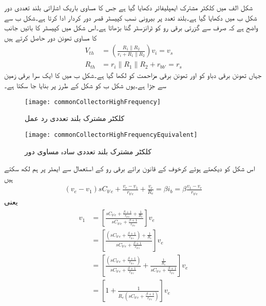 شکل  الف میں کلکٹر  مشترک ایمپلیفائر دکھایا گیا ہے جس کا مساوی باریک اشاراتی بلند تعددی دور شکل  ب میں دکھایا گیا ہے۔بلند تعدد پر بیرونی نسب کپیسٹر  قصر دور کردار ادا کرتا ہے۔شکل  ب سے واضح ہے کہ صرف  سے گزرتی برقی رو  کو ٹرانزسٹر  گنا بڑھاتا ہے۔اس شکل میں کپیسٹر  کا بائیں جانب کا مساوی تھونن دور حاصل کرتے ہیں
\begin{align*}
V_{th}&=\left(\frac{R_1 \mathbin{\|} R_2}{r_i+R_1 \mathbin{\|} R_2}\right) v_i =v_s\\
R_{th}&=r_i \mathbin{\|} R_1 \mathbin{\|} R_2 +r_{bb'}=r_s
\end{align*}
جہاں تھونن برقی دباو کو  اور تھونن برقی مزاحمت کو  لکھا گیا ہے۔شکل  ب میں  کا ایک سرا برقی زمین سے جڑا ہے۔یوں شکل  ب کو شکل  کے طرز پر بنایا جا سکتا ہے۔
%  
\begin{figure}
\centering
\texttt{[image: commonCollectorHighFrequency]}
\caption{کلکٹر  مشترک بلند تعددی رد عمل}
\label{شکل_تعددی_ردعمل_محاصل_مشترک}
\end{figure}
%
\begin{figure}
\centering
\texttt{[image: commonCollectorHighFrequencyEquivalent]}
\caption{کلکٹر  مشترک بلند تعددی سادہ مساوی دور}
\label{شکل_تعددی_ردعمل_محاصل_مشترک_سادہ_مساوی}
\end{figure}
اس شکل کو دیکھتے ہوئے کرخوف کے قانون برائے برقی رو کے استعمال سے ایمٹر        پر ہم لکھ سکتے ہیں
\begin{align*}
\left(v_e-v_1 \right)s C_{b'e} +\frac{v_e-v_1}{r_{b'e}} +\frac{v_e}{R_e}=\beta i_b=\beta \frac{v_1 -v_e}{r_{b'e}}
\end{align*}
یعنی
\begin{gather}
\begin{aligned}\label{مساوات_تعددی_ردعمل_مشترکہ_محاصل_سادہ_الف}
v_1&=\left[\frac{sC_{b'e}+\frac{\beta+1}{r_{b'e}}+\frac{1}{R_e}}{sC_{b'e}+\frac{\beta+1}{r_{b'e}}}\right] v_e\\
&=\left[\frac{\left(sC_{b'e}+\frac{\beta+1}{r_{b'e}}\right)+\frac{1}{R_e}}{sC_{b'e}+\frac{\beta+1}{r_{b'e}}}\right] v_e\\
&=\left[\frac{\left(sC_{b'e}+\frac{\beta+1}{r_{b'e}}\right)}{sC_{b'e}+\frac{\beta+1}{r_{b'e}}}+\frac{\frac{1}{R_e}}{sC_{b'e}+\frac{\beta+1}{r_{b'e}}}\right] v_e\\
&=\left[1+\frac{1}{R_e \left(sC_{b'e}+\frac{\beta+1}{r_{b'e}}\right)}\right] v_e
\end{aligned}
\end{gather}
